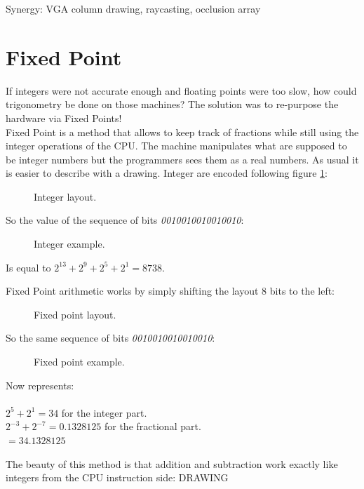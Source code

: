 \documentclass[book.tex]{subfiles}
\begin{document}
   Synergy: VGA column drawing, raycasting, occlusion array
   
\section{Fixed Point}

 
If integers were not accurate enough and floating points were too slow, how could trigonometry be done on those machines? The solution was to re-purpose the hardware via Fixed Points!\\
Fixed Point is a method that allows to keep track of fractions while still using the integer operations of the CPU. The machine manipulates what are supposed to be integer numbers but the programmers sees them as a real numbers. As usual it is easier to describe with a drawing. Integer are encoded following figure \ref{fig:int_layout}:
\begin{figure}[H]
\centering
 
 \caption{Integer layout.} \label{fig:int_layout}
 \end{figure}

So the value of the sequence of bits \emph{0010010010010010}:
\begin{figure}[H]
\centering

 \caption{Integer example.} \label{fig:mips}
 \end{figure}

 Is equal to $ 2^{13} + 2^9 + 2^5 + 2^1 =  8738 $.

\bigskip


Fixed Point arithmetic works by simply shifting the layout 8 bits to the left:
\begin{figure}[H]
 \centering
  
 \caption{Fixed point layout.} \label{fig:mips}
\end{figure}

So the same sequence of bits \emph{0010010010010010}:
\begin{figure}[H]
 \centering
   
  \caption{Fixed point example.} \label{fig:mips}
\end{figure} 

Now represents:\\
\\
$ 2^5 + 2^1 = 34 $ for the integer part.\\
$ 2^{-3}+2^{-7} = 0.1328125 $ for the fractional part.\\
$ = 34.1328125$\\

\bigskip

The beauty of this method is that addition and subtraction work exactly like integers from the CPU instruction side:
  \bigskip
  DRAWING
  \bigskip
\end{document}
